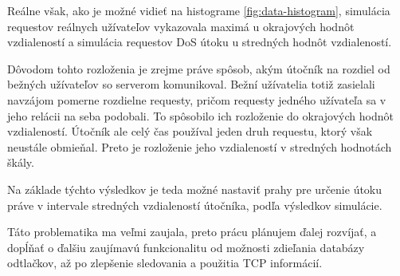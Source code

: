 \documentclass[
  printed, %
  table,   %
  lof,     %
  nolot,   %
  nocover
]{fithesis3}
\begin{document}
Reálne však, ako je možné vidieť na histograme \ref{fig:data-histogram},
simulácia requestov reálnych užívateľov vykazovala maximá u okrajových hodnôt
vzdialeností a simulácia requestov DoS útoku u stredných hodnôt vzdialeností. 

Dôvodom tohto rozloženia je zrejme práve spôsob, akým útočník na rozdiel od
bežných užívateľov so serverom komunikoval. Bežní užívatelia totiž zasielali
navzájom pomerne rozdielne requesty, pričom requesty jedného užívateľa sa v jeho
relácii na seba podobali. To spôsobilo ich rozloženie do okrajových hodnôt
vzdialeností. Útočník ale celý čas používal jeden druh requestu, ktorý však
neustále obmieňal. Preto je rozloženie jeho vzdialeností v stredných hodnotách
škály. 

Na základe týchto výsledkov je teda možné nastaviť prahy pre určenie útoku
práve v intervale stredných vzdialeností útočníka, podľa výsledkov simulácie.

Táto problematika ma veľmi zaujala, preto prácu plánujem ďalej rozvíjať,
a dopĺňať o ďalšiu zaujímavú funkcionalitu od možnosti zdieľania
databázy odtlačkov, až po zlepšenie sledovania a použitia TCP informácií.

\printbibliography
{} 

\makeatletter\thesis@blocks@clear\makeatother
{} %
\printindex

\appendix %
\end{document}
